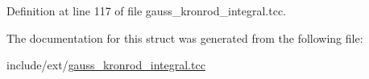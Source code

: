 Definition at line 117 of file gauss\+\_\+kronrod\+\_\+integral.\+tcc.



The documentation for this struct was generated from the following file\+:\begin{DoxyCompactItemize}
\item 
include/ext/\hyperlink{gauss__kronrod__integral_8tcc}{gauss\+\_\+kronrod\+\_\+integral.\+tcc}\end{DoxyCompactItemize}
